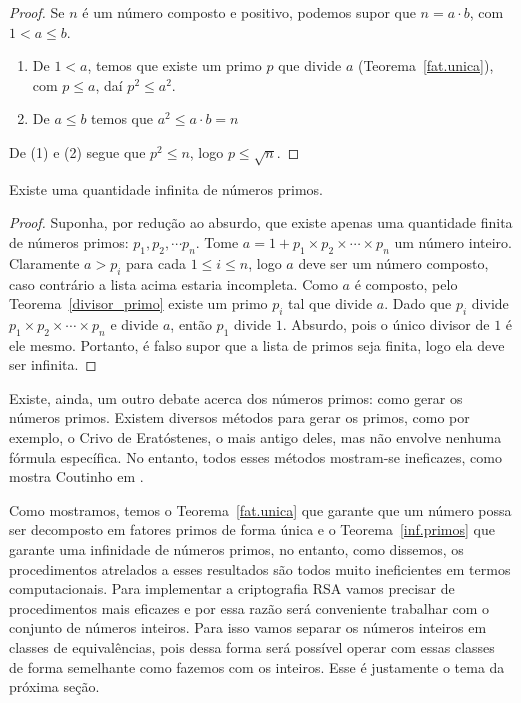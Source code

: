 \begin{proof}
Se $n$ \'e um n\'umero composto e positivo, podemos supor que $n=a\cdot b$, com $1<a\leq b$.
\begin{enumerate}
\item De $1<a$, temos que existe um primo $p$ que divide $a$ (Teorema~\ref{fat.unica}), com $p\leq a$, da\'i $p^2\leq a^2$.
\item De $a\leq b$ temos que $a^2\leq a\cdot b=n$
\end{enumerate}
De (1) e (2) segue que $p^2\leq n$, logo $p\leq\sqrt{n}$.
\end{proof}

\begin{Th}\label{inf.primos}
Existe uma quantidade infinita de n\'umeros primos.
\end{Th}

\begin{proof}
Suponha, por redu\c{c}\~ao ao absurdo, que existe apenas uma quantidade finita de n\'umeros primos: $p_1, p_2,\cdots p_n$. Tome $a=1+p_1\times p_2\times \cdots \times p_n$ um n\'umero inteiro. Claramente $a>p_i$ para cada $1\leq i\leq n$, logo $a$ deve ser um n\'umero composto, caso contr\'ario a lista acima estaria incompleta. Como $a$ \'{e} composto, pelo Teorema~\ref{divisor_primo} existe um primo $p_i$ tal que 
divide $a$. Dado que $p_i$ divide $p_1\times p_2\times \cdots \times p_n$ e divide $a$, ent\~ao $p_1$ divide $1$. Absurdo, pois o \'unico divisor de $1$ \'e ele mesmo. Portanto, \'e falso supor que a lista de primos seja finita, logo ela deve ser infinita.
\end{proof}

Existe, ainda, um outro debate acerca dos n\'umeros primos: como gerar os n\'umeros primos. Existem diversos m\'etodos para gerar os primos, como por exemplo, o Crivo de Erat\'ostenes, o mais antigo deles, mas n\~ao envolve nenhuma f\'ormula espec\'ifica. No entanto, todos esses 
m\'etodos mostram-se ineficazes, como mostra Coutinho em \cite{cou:2014}.

Como mostramos, temos o Teorema~\ref{fat.unica} que garante que um n\'umero possa ser decomposto
em fatores primos de forma \'unica e o Teorema~\ref{inf.primos} que garante uma infinidade de n\'umeros primos, no entanto, como dissemos, os procedimentos atrelados a esses resultados s\~ao todos muito ineficientes em termos computacionais. Para implementar a criptografia RSA vamos precisar de procedimentos mais eficazes e por essa raz\~ao ser\'a conveniente trabalhar com o conjunto de n\'umeros inteiros. Para isso vamos separar os n\'umeros inteiros em classes de equival\^encias, pois dessa forma ser\'a poss\'ivel operar com essas classes de forma semelhante como fazemos com os inteiros. Esse \'e justamente o tema da pr\'oxima se\c{c}\~ao.  


